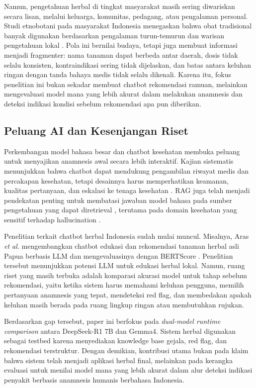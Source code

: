 \documentclass[conference]{IEEEtran}
\begin{document}
Namun, pengetahuan herbal di tingkat masyarakat masih sering diwariskan secara lisan, melalui keluarga, komunitas, pedagang, atau pengalaman personal. Studi etnobotani pada masyarakat Indonesia menegaskan bahwa obat tradisional banyak digunakan berdasarkan pengalaman turun-temurun dan warisan pengetahuan lokal \cite{b4}. Pola ini bernilai budaya, tetapi juga membuat informasi menjadi fragmenter: nama tanaman dapat berbeda antar daerah, dosis tidak selalu konsisten, kontraindikasi sering tidak dijelaskan, dan batas antara keluhan ringan dengan tanda bahaya medis tidak selalu dikenali. Karena itu, fokus penelitian ini bukan sekadar membuat chatbot rekomendasi ramuan, melainkan mengevaluasi model mana yang lebih akurat dalam melakukan anamnesis dan deteksi indikasi kondisi sebelum rekomendasi apa pun diberikan.

\subsection{Peluang AI dan Kesenjangan Riset}

Perkembangan model bahasa besar dan chatbot kesehatan membuka peluang untuk menyajikan anamnesis awal secara lebih interaktif. Kajian sistematis menunjukkan bahwa chatbot dapat mendukung pengambilan riwayat medis dan percakapan kesehatan, tetapi desainnya harus memperhatikan keamanan, kualitas pertanyaan, dan eskalasi ke tenaga kesehatan \cite{b5}. RAG juga telah menjadi pendekatan penting untuk membatasi jawaban model bahasa pada sumber pengetahuan yang dapat diretrieval \cite{b6}, terutama pada domain kesehatan yang sensitif terhadap hallucination \cite{b7}.

Penelitian terkait chatbot herbal Indonesia sudah mulai muncul. Misalnya, Aras \emph{et al.} mengembangkan chatbot edukasi dan rekomendasi tanaman herbal asli Papua berbasis LLM dan mengevaluasinya dengan BERTScore \cite{b8}. Penelitian tersebut menunjukkan potensi LLM untuk edukasi herbal lokal. Namun, ruang riset yang masih terbuka adalah komparasi akurasi model untuk tahap sebelum rekomendasi, yaitu ketika sistem harus memahami keluhan pengguna, memilih pertanyaan anamnesis yang tepat, mendeteksi red flag, dan membedakan apakah keluhan masih berada pada ruang lingkup ringan atau membutuhkan rujukan.

Berdasarkan gap tersebut, paper ini berfokus pada \emph{dual-model runtime comparison} antara DeepSeek-R1 7B dan Gemma4. Sistem herbal digunakan sebagai testbed karena menyediakan knowledge base gejala, red flag, dan rekomendasi terstruktur. Dengan demikian, kontribusi utama bukan pada klaim bahwa sistem telah menjadi aplikasi herbal final, melainkan pada kerangka evaluasi untuk menilai model mana yang lebih akurat dalam alur deteksi indikasi penyakit berbasis anamnesis humanis berbahasa Indonesia.
\end{document}

